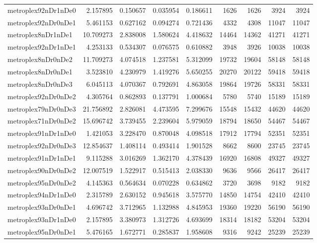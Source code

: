 \begin{longtable}{|l|r|r|r|r|r|r|r|r|}
metroplex92nDr1nDe0 & 2.157895 & 0.150657 & 0.035954 & 0.186611 & 1626 & 1626 & 3924 & 3924 \\
metroplex92nDr0nDe1 & 5.461153 & 0.627162 & 0.094274 & 0.721436 & 4332 & 4308 & 11047 & 11047 \\
metroplex8nDr1nDe1 & 10.709273 & 2.838008 & 1.580624 & 4.418632 & 14464 & 14362 & 41271 & 41271 \\
metroplex92nDr1nDe1 & 4.253133 & 0.534307 & 0.076575 & 0.610882 & 3948 & 3926 & 10038 & 10038 \\
metroplex8nDr0nDe2 & 11.709273 & 4.074518 & 1.237581 & 5.312099 & 19732 & 19604 & 58148 & 58148 \\
metroplex8nDr0nDe1 & 3.523810 & 4.230979 & 1.419276 & 5.650255 & 20270 & 20122 & 59418 & 59418 \\
metroplex8nDr0nDe3 & 6.045113 & 4.070367 & 0.792691 & 4.863058 & 19864 & 19726 & 58331 & 58331 \\
metroplex92nDr0nDe2 & 4.305764 & 0.862893 & 0.137791 & 1.000684 & 5780 & 5740 & 15189 & 15189 \\
metroplex79nDr0nDe3 & 21.756892 & 2.826081 & 4.473595 & 7.299676 & 15548 & 15432 & 44620 & 44620 \\
metroplex71nDr0nDe2 & 15.696742 & 3.739455 & 2.239604 & 5.979059 & 18794 & 18650 & 54467 & 54467 \\
metroplex91nDr1nDe0 & 1.421053 & 3.228470 & 0.870048 & 4.098518 & 17912 & 17794 & 52351 & 52351 \\
metroplex92nDr0nDe3 & 12.854637 & 1.408114 & 0.493414 & 1.901528 & 8662 & 8600 & 23745 & 23745 \\
metroplex91nDr1nDe1 & 9.115288 & 3.016269 & 1.362170 & 4.378439 & 16920 & 16808 & 49327 & 49327 \\
metroplex90nDr0nDe2 & 12.007519 & 1.522917 & 0.515413 & 2.038330 & 9636 & 9566 & 26417 & 26417 \\
metroplex95nDr0nDe2 & 4.145363 & 0.564634 & 0.070228 & 0.634862 & 3720 & 3698 & 9182 & 9182 \\
metroplex94nDr1nDe0 & 2.315789 & 2.630152 & 0.945618 & 3.575770 & 14850 & 14754 & 42410 & 42410 \\
metroplex93nDr0nDe1 & 4.696742 & 3.712965 & 1.132988 & 4.845953 & 19360 & 19220 & 56190 & 56190 \\
metroplex93nDr1nDe0 & 2.157895 & 3.380973 & 1.312726 & 4.693699 & 18314 & 18182 & 53204 & 53204 \\
metroplex95nDr0nDe1 & 5.476165 & 1.672771 & 0.285837 & 1.958608 & 9316 & 9242 & 25239 & 25239 \\

\end{longtable}
